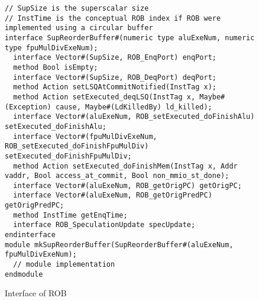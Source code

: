 \begin{figure}[!htb]
\begin{lstlisting}[caption={}]
// SupSize is the superscalar size
// InstTime is the conceptual ROB index if ROB were implemented using a circular buffer
interface SupReorderBuffer#(numeric type aluExeNum, numeric type fpuMulDivExeNum);
  interface Vector#(SupSize, ROB_EnqPort) enqPort;
  method Bool isEmpty;
  interface Vector#(SupSize, ROB_DeqPort) deqPort;
  method Action setLSQAtCommitNotified(InstTag x);
  method Action setExecuted_deqLSQ(InstTag x, Maybe#(Exception) cause, Maybe#(LdKilledBy) ld_killed);
  interface Vector#(aluExeNum, ROB_setExecuted_doFinishAlu) setExecuted_doFinishAlu;
  interface Vector#(fpuMulDivExeNum, ROB_setExecuted_doFinishFpuMulDiv) setExecuted_doFinishFpuMulDiv;
  method Action setExecuted_doFinishMem(InstTag x, Addr vaddr, Bool access_at_commit, Bool non_mmio_st_done);
  interface Vector#(aluExeNum, ROB_getOrigPC) getOrigPC;
  interface Vector#(aluExeNum, ROB_getOrigPredPC) getOrigPredPC;
  method InstTime getEnqTime;
  interface ROB_SpeculationUpdate specUpdate;
endinterface
module mkSupReorderBuffer(SupReorderBuffer#(aluExeNum, fpuMulDivExeNum);
  // module implementation
endmodule
\end{lstlisting}
\caption{Interface of ROB}\label{fig:rob-ifc}
\end{figure}


